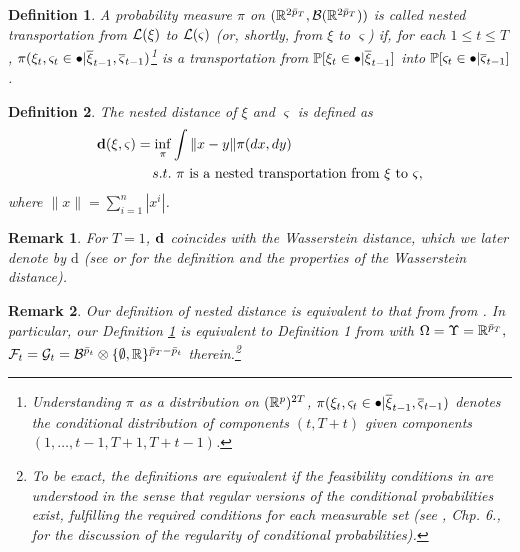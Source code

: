 \documentclass{article}              %
\newtheorem{definition}{Definition}
\newtheorem{remark}{Remark}
\begin{document}
\begin{definition}
\label{dt} A probability measure $\pi$
on $(\mathbb{R}^{2\bar{p}_{T}},\mathcal{B}(\mathbb{R}^{2\bar{p}_{T}}))$ 
is called \emph{nested transportation} from $\mathcal{L}(\xi)$ to $\mathcal{L}(\varsigma)$ (or, shortly, from $\xi$ to $\varsigma$)
if, for each $1\leq t\leq T$, $\pi(\xi_{t},\varsigma_{t}\in\bullet|\overline{\xi}_{t-1},\overline{\varsigma}_{t-1})$\footnote{Understanding $\pi$ as a distribution on $(\mathbb{R}^p)^{2T}$, $\pi(\xi_{t},\varsigma_{t}\in\bullet|\overline{\xi}_{t-1},\overline{\varsigma}_{t-1})$ denotes the conditional distribution of components $(t,T+t)$ given components $(1,\dots,t-1,T+1,T+t-1)$.}
 is a transportation from $\mathbb{P}[\xi_{t}\in\bullet|\overline{\xi}_{t-1}]$ into
$\mathbb{P}[\varsigma_{t}\in\bullet|\overline{\varsigma}_{t-1}]$.
\end{definition}

\begin{definition}
\label{def:d} The \emph{nested distance} of $\xi$ and $\varsigma$
is defined as
\begin{align*}
\mathbf{d}(\xi,\varsigma)=\inf_{\pi} & \int\|x-y\|\pi(dx,dy)\\
s.t. & \text{ \ensuremath{\pi} is a nested transportation from \ensuremath{\xi\ }to \ensuremath{\varsigma}},
\end{align*}
where $\|x\|=\sum_{i=1}^{n}|x^{i}|$.
\end{definition}

\begin{remark}
For $T=1$, $\mathbf{d}$ coincides with the Wasserstein distance, which we
later denote by $\mathrm{d}$ (see \cite{pflug2014multistage} or
\cite{villani2003topics} for the definition and the properties of
the Wasserstein distance).
\end{remark}

\begin{remark}
\label{rem:cpp}Our definition of nested distance is equivalent to that from 
from \cite{pflug2012distance}. In particular, our Definition \ref{dt} is equivalent to Definition 1 from \cite{pflug2012distance} with $\Omega=\Upsilon=\mathbb{R}^{\bar{p}_{T}},$$\mathcal{F}_{t}=\mathcal{G}_{t}=\mathcal{B}^{\bar{p}_{t}}\otimes\{\emptyset,\mathbb{R}\}^{\bar{p}_{T}-\bar{p}_{t}}$ therein.\footnote{To be exact, the definitions are equivalent if the feasibility conditions
in \cite{pflug2012distance} are understood in the sense that regular
versions of the conditional probabilities exist, fulfilling the required
conditions for each measurable set (see \cite{Kallenberg02}, Chp.
6., for the discussion of the regularity of conditional probabilities).}
\end{remark}
\end{document}
